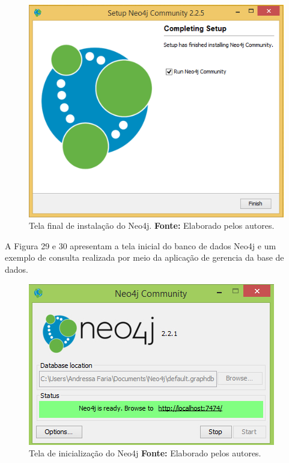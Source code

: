 \begin{figure}[h!]
	\centerline{\includegraphics[scale=0.4]{./imagens/neo4j-install-step5.png}}
	\caption[Tela final de instalação do Neo4j]
	{Tela final de instalação do Neo4j. \textbf{Fonte:} Elaborado pelos autores.}
	\label{fig:exemplo1}
	
\end{figure}

\par A Figura 29 e 30 apresentam a tela inicial do banco de dados Neo4j e um exemplo de consulta realizada por meio da aplicação de gerencia da base de dados.

\begin{figure}[h!]
	\centerline{\includegraphics[scale=0.60]{./imagens/neo4j.jpg}}
	\caption[Tela de inicialização do Neo4j ]
	{Tela de inicialização do Neo4j \textbf{Fonte:} Elaborado pelos autores.}
	\label{fig:exemplo1}
\end{figure}

